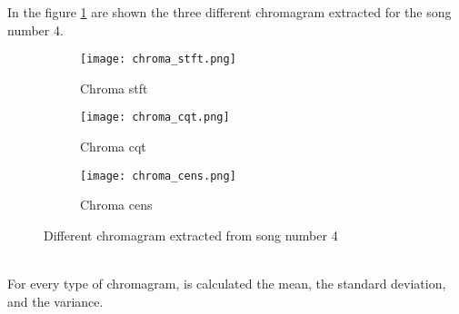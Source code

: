 In the figure \ref{fig:chroma} are shown the three different chromagram extracted for the song number 4.
\begin{figure}[h]
    \centering
    \begin{subfigure}{{\textwidth}}
    		\texttt{[image: chroma\_stft.png]}
    		\caption{Chroma stft}
    \end{subfigure}
    \begin{subfigure}{\textwidth}
    		\texttt{[image: chroma\_cqt.png]} 
    		\caption{Chroma cqt}
    \end{subfigure}
    \begin{subfigure}{\textwidth}
    		\texttt{[image: chroma\_cens.png]} 
    		\caption{Chroma cens}
    \end{subfigure}
    \caption{Different chromagram extracted from song number 4}
    \label{fig:chroma}
\end{figure}
\\
For every type of chromagram, is calculated the mean, the standard deviation, and the variance.

